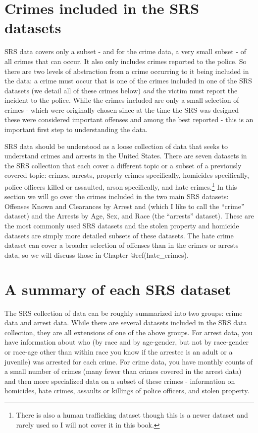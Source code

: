 \documentclass[
]{krantz}
\begin{document}
\section{Crimes included in the SRS
datasets}\label{crimes-included-in-the-srs-datasets}

SRS data covers only a subset - and for the crime data, a
very small subset - of all crimes that can occur. It also
only includes crimes reported to the police. So there are
two levels of abstraction from a crime occurring to it being
included in the data: a crime must occur that is one of the
crimes included in one of the SRS datasets (we detail all of
these crimes below) \emph{and} the victim must report the
incident to the police. While the crimes included are only a
small selection of crimes - which were originally chosen
since at the time the SRS was designed these were considered
important offenses and among the best reported - this is an
important first step to understanding the data.

SRS data should be understood as a loose collection of data
that seeks to understand crimes and arrests in the United
States. There are seven datasets in the SRS collection that
each cover a different topic or a subset of a previously
covered topic: crimes, arrests, property crimes
specifically, homicides specifically, police officers killed
or assaulted, arson specifically, and hate
crimes.\footnote{There is also a human trafficking dataset
  though this is a newer dataset and rarely used so I will
  not cover it in this book.} In this section we will go
over the crimes included in the two main SRS datasets:
Offenses Known and Clearances by Arrest and (which I like to
call the ``crime'' dataset) and the Arrests by Age, Sex, and
Race (the ``arrests'' dataset). These are the most commonly
used SRS datasets and the stolen property and homicide
datasets are simply more detailed subsets of these datasets.
The hate crime dataset can cover a broader selection of
offenses than in the crimes or arrests data, so we will
discuss those in Chapter @ref(hate\_crimes).

\section{A summary of each SRS
dataset}\label{a-summary-of-each-srs-dataset}

The SRS collection of data can be roughly summarized into
two groups: crime data and arrest data. While there are
several datasets included in the SRS data collection, they
are all extensions of one of the above groups. For arrest
data, you have information about who (by race and by
age-gender, but not by race-gender or race-age other than
within race you know if the arrestee is an adult or a
juvenile) was arrested for each crime. For crime data, you
have monthly counts of a small number of crimes (many fewer
than crimes covered in the arrest data) and then more
specialized data on a subset of these crimes - information
on homicides, hate crimes, assaults or killings of police
officers, and stolen property.
\end{document}
